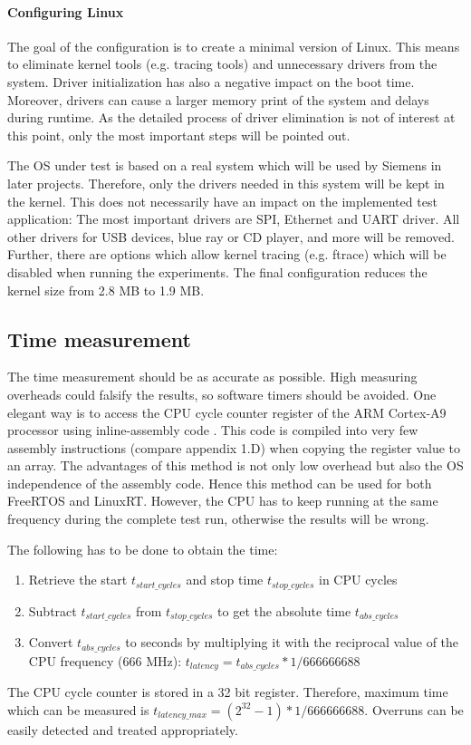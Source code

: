 \paragraph{Configuring Linux}
The goal of the configuration is to create a minimal version of Linux.
This means to eliminate kernel tools (e.g. tracing tools) and unnecessary drivers from the system. 
Driver initialization has also a negative impact on the boot time.
Moreover, drivers can cause a larger memory print of the system and delays during runtime. 
As the detailed process of driver elimination is not of interest at this point, only the most important steps will be pointed out.
\par
The \ac{OS} under test is based on a real system which will be used by Siemens in later projects.
Therefore, only the drivers needed in this system will be kept in the kernel.
This does not necessarily have an impact on the implemented test application:
The most important drivers are \ac{SPI}, Ethernet and \ac{UART} driver.
All other drivers for \ac{USB} devices, blue ray or CD player, and more will be removed.
Further, there are options which allow kernel tracing (e.g. ftrace) which will be disabled when running the experiments.  
The final configuration reduces the kernel size from 2.8 MB to 1.9 MB. 

\subsection{Time measurement}
The time measurement should be as accurate as possible.
High measuring overheads could falsify the results, so software timers should be avoided. 
One elegant way is to access the \ac{CPU} cycle counter register of the ARM Cortex-A9 processor using inline-assembly code \cite{arm:aarmaaae}.
This code is compiled into very few assembly instructions (compare appendix 1.D) when copying the register value to an array.
The advantages of this method is not only low overhead but also the \ac{OS} independence of the assembly code.
Hence this method can be used for both FreeRTOS and LinuxRT.
However, the \ac{CPU} has to keep running at the same frequency during the complete test run, otherwise the results will be wrong.
\par
The following has to be done to obtain the time:
\begin{enumerate}
	\item Retrieve the start $t_{start\_cycles}$ and stop time $t_{stop\_cycles}$ in \ac{CPU} cycles
	\item Subtract $t_{start\_cycles}$ from $t_{stop\_cycles}$ to get the absolute time $t_{abs\_cycles}$
	\item Convert $t_{abs\_cycles}$ to seconds by multiplying it with the reciprocal value of the \ac{CPU} frequency (666 MHz): $t_{latency} = t_{abs\_cycles} * 1/666666688$
\end{enumerate}
The \ac{CPU} cycle counter is stored in a 32 bit register.
Therefore, maximum time which can be measured is $t_{latency\_max} = (2^{32}-1) * 1/666666688 $.
Overruns can be easily detected and treated appropriately. 

